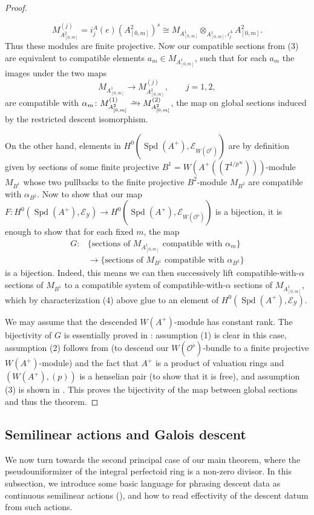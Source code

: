 \documentclass[10pt,twoside]{article}
\numberwithin{equation}{section}
\newcommand\isom{
	\xrightarrow{\smash{\raisebox{-0.65ex}{\ensuremath{\scriptstyle\sim}}}}
}
\theoremstyle{plain}
\theoremstyle{definition}
\DeclareMathOperator{\Spd}{Spd}
\newcommand{\MCE}{\mathcal{E}}
\newcommand{\MCO}{\mathcal{O}}
\newcommand{\MCY}{\mathcal{Y}}
\newcommand{\pRoots}{{1/p^\infty}}
\begin{document}
\begin{proof}
\begin{enumerate}
    \[M^{(j)}_{A^2_{[0,m]}}=i_j^A(e)(A^2_{[0,m]})^s\cong M_{A^1_{[0,m]}}\otimes_{A^1_{[0,m]},i_j^A}A^2_{[0,m]}.\]
    Thus these modules are finite projective. Now our compatible sections from (3) are equivalent to compatible elements \(a_m\in M_{A^1_{[0,m]}}\), such that for each \(a_m\) the images under the two maps
    \[M_{A^1_{[0,m]}}\longrightarrow M^{(j)}_{A^2_{[0,m]}},\qquad j=1,2,\]
    are compatible with \(\alpha_m\colon M^{(1)}_{A^2_{[0,m]}}\isom M^{(2)}_{A^2_{[0,m]}}\), the map on global sections induced by the restricted descent isomorphism.
\end{enumerate}
On the other hand, elements in \(H^0(\Spd(A^+),\MCE_{W(\MCO^\flat)})\) are by definition given by sections of some finite projective \(B^1=W(A^+((T^{\pRoots})))\)-module \(M_{B^1}\) whose two pullbacks to the finite projective \(B^2\)-module \(M_{B^2}\) are compatible with \(\alpha_{B^2}\). Now to show that our map \(F\colon H^0(\Spd(A^+),\MCE_{\MCY})\to H^0(\Spd(A^+), \MCE_{W(\MCO^\flat)})\) is a bijection, it is enough to show that for each fixed \(m\), the map
\[
\begin{aligned}
G\colon {}&\{\text{sections of \(M_{A^1_{[0,m]}}\) compatible with \(\alpha_m\)}\}\\
&\longrightarrow
\{\text{sections of \(M_{B^1}\) compatible with \(\alpha_{B^2}\)}\}
\end{aligned}
\]
is a bijection.
Indeed, this means we can then successively lift compatible-with-\(\alpha\) sections of \(M_{B^1}\) to a compatible system of compatible-with-\(\alpha\) sections of \(M_{A^1_{[0,m]}}\), which by characterization (4) above glue to an element of \(H^0(\Spd(A^+),\MCE_{\MCY})\).\par
We may assume that the descended \(W(A^+)\)-module has constant rank. The bijectivity of \(G\) is essentially proved in : assumption (1) is clear in this case, assumption (2) follows from  (to descend our \(W(\MCO^\flat)\)-bundle to a finite projective \(W(A^+)\)-module) and the fact that \(A^+\) is a product of valuation rings and \((W(A^+), (p))\) is a henselian pair (to show that it is free), and assumption (3) is shown in . This proves the bijectivity of the map between global sections and thus the theorem.
\end{proof}

\subsection{Semilinear actions and Galois descent}
We now turn towards the second principal case of our main theorem, where the pseudouniformizer of the integral perfectoid ring is a non-zero divisor. In this subsection, we introduce some basic language for phrasing descent data as continuous semilinear actions (),  and how to read effectivity of the descent datum from such actions.
\end{document}
